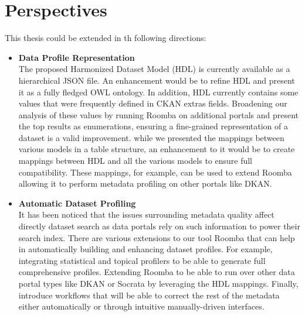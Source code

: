 \section{Perspectives}

This thesis could be extended in th following directions:

\begin{itemize}

\item \textbf{Data Profile Representation}
\vspace{1mm}
\\
The proposed Harmonized Dataset Model (HDL) is currently available as a hierarchical JSON file. An enhancement would be to refine HDL and present it as a fully fledged OWL ontology. In addition, HDL currently contains some values that were frequently defined in CKAN extras fields. Broadening our analysis of these values by running Roomba on additional portals and present the top results as enumerations, ensuring a fine-grained representation of a dataset is a valid improvement. while we presented the mappings between various models in a table structure, an enhancement to it would be to create mappings between HDL and all the various models to ensure full compatibility. These mappings, for example, can be used to extend Roomba allowing it to perform metadata profiling on other portals like DKAN.

\item \textbf{Automatic Dataset Profiling}
\vspace{1mm}
\\
It has been noticed that the issues surrounding metadata quality affect directly dataset search as data portals rely on such information to power their search index. There are various extensions to our tool Roomba that can help in automatically building and enhancing dataset profiles. For example, integrating statistical and topical profilers to be able to generate full comprehensive profiles. Extending Roomba to be able to run over other data portal types like DKAN or Socrata by leveraging the HDL mappings. Finally, introduce workflows that will be able to correct the rest of the metadata either automatically or through intuitive manually-driven interfaces.


\end{itemize}
